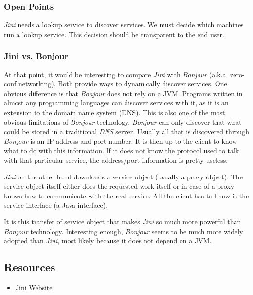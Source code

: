 \subsubsection{Open Points}
\emph{Jini} needs a lookup service to discover services. We must decide which machines run a lookup service. This decision should be transparent to the end user.

\subsubsection{Jini vs. Bonjour}
At that point, it would be interesting to compare \emph{Jini} with \emph{Bonjour} (a.k.a. zero-conf networking). Both provide ways to dynamically discover services. One obvious difference is that \emph{Bonjour} does not rely on a JVM. Programs written in almost any programming languages can discover services with it, as it is an extension to the domain name system (DNS). This is also one of the most obvious limitations of \emph{Bonjour} technology. \emph{Bonjour} can only discover that what could be stored in a traditional \emph{DNS} server. Usually all that is discovered through \emph{Bonjour} is an IP address and port number. It is then up to the client to know what to do with this information. If it does not know the protocol used to talk with that particular service, the address/port information is pretty useless.

\emph{Jini} on the other hand downloads a service object (usually a proxy object). The service object itself either does the requested work itself or in case of a proxy knows how to communicate with the real service. All the client has to know is the service interface (a Java interface).

It is this transfer of service object that makes \emph{Jini} so much more powerful than \emph{Bonjour} technology. Interesting enough, \emph{Bonjour} seems to be much more widely adopted than \emph{Jini}, most likely because it does not depend on a JVM.


\subsection{Resources}
\begin{itemize}
 \item \href{http://www.jini.org/}{Jini Website}
\end{itemize}
